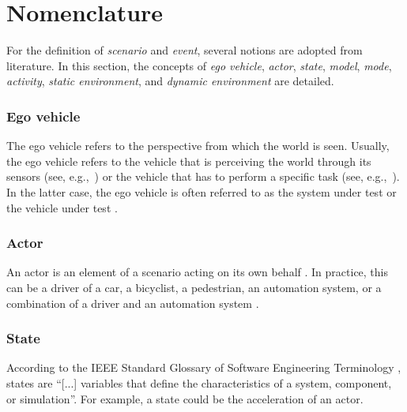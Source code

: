 \section{Nomenclature}
\label{sec:nomenclature}

For the definition of \emph{scenario} and \emph{event}, several notions are adopted from literature. In this section, the concepts of \emph{ego vehicle}, \emph{actor}, \emph{state}, \emph{model}, \emph{mode}, \emph{activity}, \emph{static environment}, and \emph{dynamic environment} are detailed. 

\subsubsection{Ego vehicle}
\label{sec:ego vehicle}
The ego vehicle refers to the perspective from which the world is seen. Usually, the ego vehicle refers to the vehicle that is perceiving the world through its sensors (see, e.g.,~\cite{Bonnin2014}) or the vehicle that has to perform a specific task (see, e.g.,~\cite{althoff2017CommonRoad}). In the latter case, the ego vehicle is often referred to as the system under test \cite{stellet2015taxonomy} or the vehicle under test \cite{gietelink2006development}.

\subsubsection{Actor}
\label{sec:actor}
An actor is an element of a scenario acting on its own behalf \cite{ulbrich2015}. In practice, this can be a driver of a car, a bicyclist, a pedestrian, an automation system, or a combination of a driver and an automation system \cite{geyer2014}.

\subsubsection{State}
\label{sec:state}
According to the IEEE Standard Glossary of Software Engineering Terminology \cite{ieee1990glossary}, states are ``[...] variables that define the characteristics of a system, component, or simulation''. For example, a state could be the acceleration of an actor.

